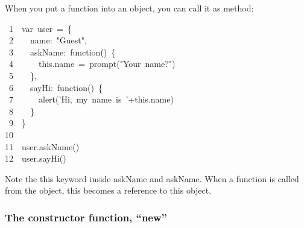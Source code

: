 \documentclass{article}
\begin{document}
\noindent{}When you put a function into an object, you can call it as method:%
\begin{mdpre}%
\noindent~{1}~~{var}~user~=~\{\\
~{2}~~~~name:~{"}{Guest}{"},\\
~{3}~~~~askName:~{function}()~\{\\
~{4}~~~~~~{this}.name~=~prompt({"}{Your~name?}{"})\\
~{5}~~~~\},\\
~{6}~~~~sayHi:~{function}()~\{\\
~{7}~~~~~~alert({'}{Hi,~my~name~is~}{'}+{this}.name)\\
~{8}~~~~\}\\
~{9}~~\}\\
{10}\\
{11}~~user.askName()\\
{12}~~user.sayHi()%
\end{mdpre}\noindent{}Note the this keyword inside askName and askName. When a function is called from the object, this becomes a reference to this object.

\subsubsection{The constructor function, \textquotedblleft{}new\textquotedblright{}}\label{sec3-the-constructor-function-new}%
\end{document}
